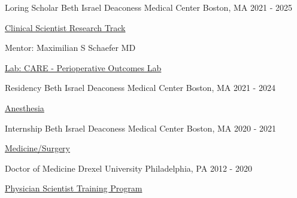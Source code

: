 

\begin{cventries}

  \cventry
    {Loring Scholar}
    {Beth Israel Deaconess Medical Center}
    {Boston, MA}
    {2021 - 2025}
    {
    \begin{cvitems}
    \item \href{https://www.bidmc.org/medical-education/medical-education-by-department/anesthesia-critical-care-and-pain-medicine/anesthesia-residency-program/research-and-other-opportunities/clinician-scientist-track}{Clinical Scientist Research Track}
    \item Mentor: Maximilian S Schaefer MD
    \item \href{https://www.bidmc.org/research/research-by-department/anesthesia-critical-care-and-pain-medicine/research-centers/care}{Lab: CARE - Perioperative Outcomes Lab}
    \end{cvitems}
    }

\cventry
    {Residency}
    {Beth Israel Deaconess Medical Center}
    {Boston, MA}
    {2021 - 2024}
    {
    \begin{cvitems}
    \item \href{https://www.bidmc.org/medical-education/medical-education-by-department/anesthesia-critical-care-and-pain-medicine/anesthesia-residency-program}{Anesthesia}
    \end{cvitems}
    }
    
    \cventry
    {Internship}
    {Beth Israel Deaconess Medical Center}
    {Boston, MA}
    {2020 - 2021}
    {
    \begin{cvitems}
    \item \href{https://www.bidmc.org/medical-education/medical-education-by-department/anesthesia-critical-care-and-pain-medicine/anesthesia-residency-program/research-and-other-opportunities/clinician-scientist-track}{Medicine/Surgery}
    \end{cvitems}
    }
 
   \cventry
    {Doctor of Medicine} %
    {Drexel University} %
    {Philadelphia, PA} %
    {2012 - 2020} %
    {
    \begin{cvitems} %
    \item \href{https://drexel.edu/medicine/academics/dual-degree-programs/md-phd/students-alumni/}{Physician Scientist Training Program}
    \end{cvitems}
    }
    

\end{cventries}
